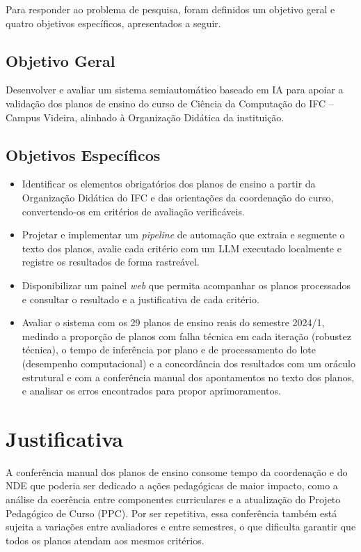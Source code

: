 Para responder ao problema de pesquisa, foram definidos um objetivo geral e quatro objetivos específicos, apresentados a seguir.

\subsection{Objetivo Geral}

Desenvolver e avaliar um sistema semiautomático baseado em IA para apoiar a validação dos planos de ensino do curso de Ciência da Computação do IFC -- Campus Videira, alinhado à Organização Didática da instituição.

\subsection{Objetivos Específicos}

\begin{itemize}
    \item Identificar os elementos obrigatórios dos planos de ensino a partir da Organização Didática do IFC e das orientações da coordenação do curso, convertendo-os em critérios de avaliação verificáveis.
    \item Projetar e implementar um \textit{pipeline} de automação que extraia e segmente o texto dos planos, avalie cada critério com um LLM executado localmente e registre os resultados de forma rastreável.
    \item Disponibilizar um painel \textit{web} que permita acompanhar os planos processados e consultar o resultado e a justificativa de cada critério.
    \item Avaliar o sistema com os 29 planos de ensino reais do semestre 2024/1, medindo a proporção de planos com falha técnica em cada iteração (robustez técnica), o tempo de inferência por plano e de processamento do lote (desempenho computacional) e a concordância dos resultados com um oráculo estrutural e com a conferência manual dos apontamentos no texto dos planos, e analisar os erros encontrados para propor aprimoramentos.
\end{itemize}

\section{Justificativa}

A conferência manual dos planos de ensino consome tempo da coordenação e do NDE que poderia ser dedicado a ações pedagógicas de maior impacto, como a análise da coerência entre componentes curriculares e a atualização do Projeto Pedagógico de Curso (PPC). Por ser repetitiva, essa conferência também está sujeita a variações entre avaliadores e entre semestres, o que dificulta garantir que todos os planos atendam aos mesmos critérios.


